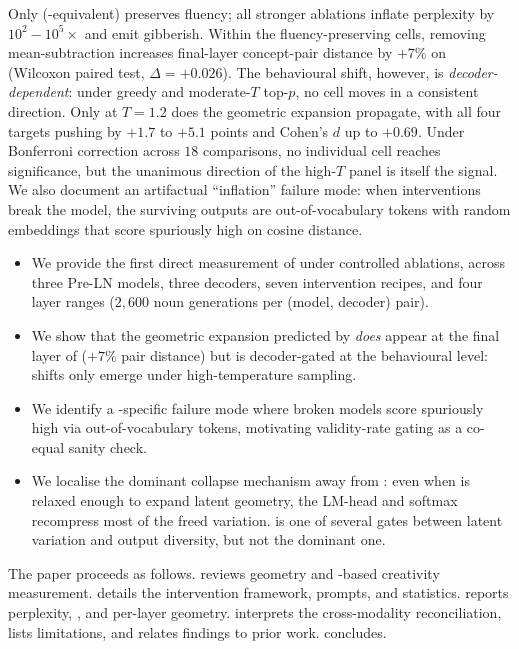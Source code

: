 Only \nomean (\ie \rmsnorm-equivalent) preserves fluency; all stronger
ablations inflate perplexity by $10^{2}\!-\!10^{5}\times$ and emit gibberish.
Within the fluency-preserving cells, removing mean-subtraction increases
final-layer concept-pair distance by $+7\%$ on \pythia (Wilcoxon paired
test, $\Delta{=}{+}0.026$). The behavioural \dat shift, however, is
\emph{decoder-dependent}: under greedy and moderate-$T$ top-$p$, no cell
moves \dat in a consistent direction. Only at $T{=}1.2$ does the geometric
expansion propagate, with all four \nomean targets pushing \dat by $+1.7$
to $+5.1$ points and Cohen's $d$ up to $+0.69$. Under Bonferroni correction
across $18$ comparisons, no individual cell reaches significance, but the
unanimous direction of the high-$T$ panel is itself the signal. We also
document an artifactual ``\dat inflation'' failure mode: when interventions
break the model, the surviving outputs are out-of-vocabulary tokens with
random embeddings that score spuriously high on cosine distance.

\begin{itemize}[leftmargin=*,itemsep=0pt,topsep=0pt]
    \item We provide the first direct measurement of \dat under controlled
          \layernorm ablations, across three Pre-LN models, three decoders,
          seven intervention recipes, and four layer ranges
          ($2{,}600$ noun generations per (model, decoder) pair).
    \item We show that the geometric expansion predicted by
          \citet{gupta2024geometric} \emph{does} appear at the final layer of
          \pythia ($+7\%$ pair distance) but is decoder-gated at the
          behavioural level: \dat shifts only emerge under high-temperature
          sampling.
    \item We identify a \dat-specific failure mode where broken models
          score spuriously high via out-of-vocabulary tokens, motivating
          validity-rate gating as a co-equal sanity check.
    \item We localise the dominant collapse mechanism away from
          \layernorm: even when \layernorm is relaxed enough to expand
          latent geometry, the LM-head and softmax recompress most of the
          freed variation. \layernorm is one of several gates between
          latent variation and output diversity, but not the dominant one.
\end{itemize}

The paper proceeds as follows.
 reviews \layernorm geometry and \dat-based
creativity measurement.  details the intervention
framework, prompts, and statistics.  reports
perplexity, \dat, and per-layer geometry. 
interprets the cross-modality reconciliation, lists limitations, and
relates findings to prior work.  concludes.
